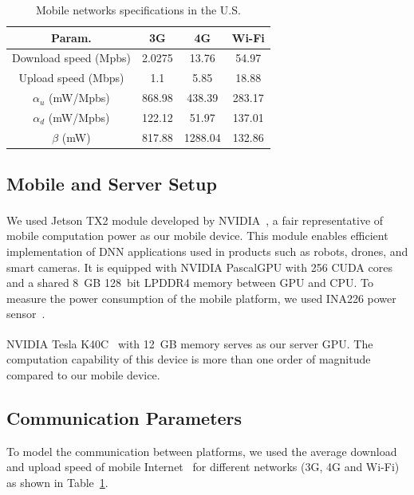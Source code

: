 \begin{table}[h]
	\caption{Mobile networks specifications in the U.S.} 
	\centering 
	\begin{tabular}{|c|c|c|c|} \hline
	\textbf{Param.} & \textbf{3G} & \textbf{4G} & \textbf{Wi-Fi} \\ \hline
	Download speed (Mpbs)	& 	2.0275 	&	13.76 	&	54.97 \\ \hline
	Upload speed (Mbps)	&	1.1		&	5.85	&	18.88 \\ \hline
$\alpha_u$ (mW/Mpbs)	& 868.98	& 438.39	&	283.17    \\ \hline
$\alpha_d$ (mW/Mpbs)	 & 122.12 	& 51.97	&	137.01        \\ \hline
$\beta$ (mW)	& 817.88	& 1288.04	&	132.86            \\ \hline
\end{tabular}
\label{table:network_parameters} 
\end{table}

\subsection{Mobile and Server Setup}
We used Jetson TX2 module developed by NVIDIA\textsuperscript{\textregistered}~\cite{JetsonTX2}, a fair representative of mobile computation power as our mobile device. This module enables efficient implementation of DNN applications used in products such as robots, drones, and smart cameras. It is equipped with NVIDIA Pascal\textregistered GPU with 256 CUDA cores and a shared 8~GB 128~bit LPDDR4 memory between GPU and CPU. To measure the power consumption of the mobile platform, we used INA226 power sensor~\cite{INA226}. 

NVIDIA\textsuperscript{\textregistered} Tesla\textsuperscript{\textregistered} K40C~\cite{TeslaGPU} with 12~GB memory serves as our server GPU. The computation capability of this device is more than one order of magnitude compared to our mobile device. 

\subsection{Communication Parameters}
To model the communication between platforms, we used the average download and upload speed of mobile Internet~\cite{MobNet, Speedtest} for different networks (3G, 4G and Wi-Fi) as shown in Table~\ref{table:network_parameters}.


